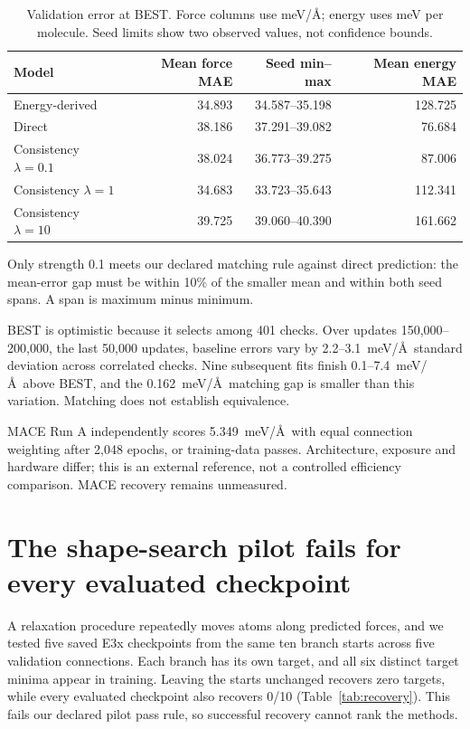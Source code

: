 \documentclass{article}
\begin{document}
\begin{table}[htbp]
\centering\small
\caption{Validation error at BEST. Force columns use meV/\AA; energy uses meV per molecule. Seed limits show two observed values, not confidence bounds.}\label{tab:prediction}
\begin{tabular}{lrrr}\toprule
Model & Mean force MAE & Seed min--max & Mean energy MAE\\\midrule
Energy-derived & 34.893 & 34.587--35.198 & 128.725\\
Direct & 38.186 & 37.291--39.082 & 76.684\\
Consistency $\lambda=0.1$ & 38.024 & 36.773--39.275 & 87.006\\
Consistency $\lambda=1$ & 34.683 & 33.723--35.643 & 112.341\\
Consistency $\lambda=10$ & 39.725 & 39.060--40.390 & 161.662\\\bottomrule
\end{tabular}
\end{table}

Only strength 0.1 meets our declared matching rule against direct prediction: the mean-error gap must be within 10\% of the smaller mean and within both seed spans. A span is maximum minus minimum.

BEST is optimistic because it selects among 401 checks. Over updates 150,000--200,000, the last 50,000 updates, baseline errors vary by 2.2--3.1~meV/\AA\ standard deviation across correlated checks. Nine subsequent fits finish 0.1--7.4~meV/\AA\ above BEST, and the 0.162~meV/\AA\ matching gap is smaller than this variation. Matching does not establish equivalence.

MACE Run A independently scores 5.349~meV/\AA\ with equal connection weighting after 2,048 epochs, or training-data passes. Architecture, exposure and hardware differ; this is an external reference, not a controlled efficiency comparison. MACE recovery remains unmeasured.

\section{The shape-search pilot fails for every evaluated checkpoint}
A relaxation procedure repeatedly moves atoms along predicted forces, and we tested five saved E3x checkpoints from the same ten branch starts across five validation connections. Each branch has its own target, and all six distinct target minima appear in training. Leaving the starts unchanged recovers zero targets, while every evaluated checkpoint also recovers 0/10 (Table~\ref{tab:recovery}). This fails our declared pilot pass rule, so successful recovery cannot rank the methods.
\end{document}
